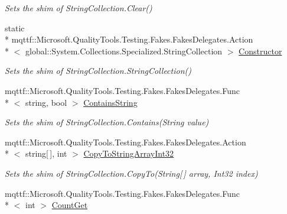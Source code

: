 \begin{DoxyCompactItemize}
\begin{DoxyCompactList}\small\item\em Sets the shim of String\-Collection.\-Clear()\end{DoxyCompactList}\item 
static \\*
mqttf\-::\-Microsoft.\-Quality\-Tools.\-Testing.\-Fakes.\-Fakes\-Delegates.\-Action\\*
$<$ global\-::\-System.\-Collections.\-Specialized.\-String\-Collection $>$ \hyperlink{class_system_1_1_collections_1_1_specialized_1_1_fakes_1_1_shim_string_collection_a01df25edc65b7ba1b23a15a76084117e}{Constructor}
\begin{DoxyCompactList}\small\item\em Sets the shim of String\-Collection.\-String\-Collection()\end{DoxyCompactList}\item 
mqttf\-::\-Microsoft.\-Quality\-Tools.\-Testing.\-Fakes.\-Fakes\-Delegates.\-Func\\*
$<$ string, bool $>$ \hyperlink{class_system_1_1_collections_1_1_specialized_1_1_fakes_1_1_shim_string_collection_a3740c7b0dbfb6acb9f235e46597db283}{Contains\-String}
\begin{DoxyCompactList}\small\item\em Sets the shim of String\-Collection.\-Contains(\-String value)\end{DoxyCompactList}\item 
mqttf\-::\-Microsoft.\-Quality\-Tools.\-Testing.\-Fakes.\-Fakes\-Delegates.\-Action\\*
$<$ string\mbox{[}$\,$\mbox{]}, int $>$ \hyperlink{class_system_1_1_collections_1_1_specialized_1_1_fakes_1_1_shim_string_collection_a7e2124b6968739bcfd42cfb2122c2990}{Copy\-To\-String\-Array\-Int32}
\begin{DoxyCompactList}\small\item\em Sets the shim of String\-Collection.\-Copy\-To(\-String\mbox{[}$\,$\mbox{]} array, Int32 index)\end{DoxyCompactList}\item 
mqttf\-::\-Microsoft.\-Quality\-Tools.\-Testing.\-Fakes.\-Fakes\-Delegates.\-Func\\*
$<$ int $>$ \hyperlink{class_system_1_1_collections_1_1_specialized_1_1_fakes_1_1_shim_string_collection_a20b5773339ecd1248979030ccf3fc54f}{Count\-Get}

\end{DoxyCompactItemize}
